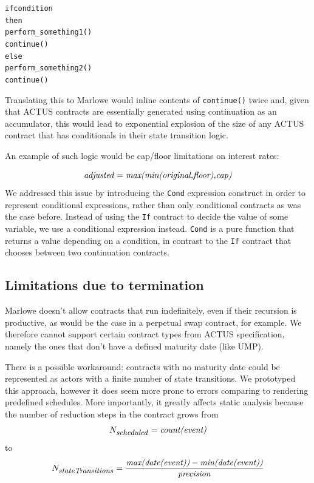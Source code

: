 \documentclass[runningheads]{llncs}
\newcommand{\ident}[1]{\mbox{\emph{#1}}}
\begin{document}
\begin{alltt}
if condition 
  then 
    perform\_something1()
    continue() 
  else 
    perform\_something2() 
    continue()
\end{alltt}
\noindent
Translating this to Marlowe would inline contents of \texttt{continue()} twice and, given that ACTUS
contracts are essentially generated using continuation as an accumulator,
this would lead to exponential explosion of the size of any ACTUS
contract that has conditionals in their state transition logic.

An example of such logic would be cap/floor limitations on interest rates:

\noindent 
\begin{equation*}
\ident{adjusted}=\ident{max(min(original,floor),cap)}
\end{equation*}
\noindent
We addressed this issue by introducing the \texttt{Cond} expression construct in order
to represent conditional expressions, rather than only conditional contracts as was the case before. Instead of using the \texttt{If}
contract to decide the value of some variable, we use a conditional expression instead.  
\texttt{Cond} is  a pure function
that returns a value depending on a condition, in contrast to the \texttt{If}
contract that chooses between two continuation contracts. 

\subsection{Limitations due to termination}

Marlowe doesn't allow contracts that run indefinitely, even if their recursion
is productive, as would be the case in a perpetual swap contract, for example. We therefore cannot support certain
contract types from ACTUS specification, namely the ones that don't
have a defined maturity date (like UMP). 

There is a possible workaround: contracts with no maturity date
could be represented as actors with a finite number of state transitions.
We prototyped this approach, %
however it does
seem more prone to errors comparing to rendering predefined schedules.
More importantly, it greatly affects static analysis because the number
of reduction steps in the contract grows from 
\noindent 
\begin{equation*}
N_{\footnotesize \ident{scheduled}}=\ident{count(event)}
\end{equation*}
to 
\noindent 
\begin{equation*}
N_{\footnotesize \ident{stateTransitions}}=\frac{\ident{max(date(event))}-\ident{min(date(event))}}{\ident{precision}} 
\end{equation*}
\end{document}
